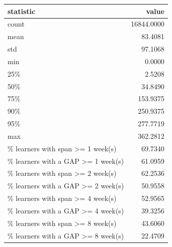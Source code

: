 \begin{tabular}{lr}
\toprule
statistic & value \\
\midrule
count & 16844.0000 \\
mean & 83.4081 \\
std & 97.1068 \\
min & 0.0000 \\
25\% & 2.5208 \\
50\% & 34.8490 \\
75\% & 153.9375 \\
90\% & 250.9375 \\
95\% & 277.7719 \\
max & 362.2812 \\
\% learners with span >= 1 week(s) & 69.7340 \\
\% learners with a GAP >= 1 week(s) & 61.0959 \\
\% learners with span >= 2 week(s) & 62.2536 \\
\% learners with a GAP >= 2 week(s) & 50.9558 \\
\% learners with span >= 4 week(s) & 52.9565 \\
\% learners with a GAP >= 4 week(s) & 39.3256 \\
\% learners with span >= 8 week(s) & 43.6060 \\
\% learners with a GAP >= 8 week(s) & 22.4709 \\
\bottomrule
\end{tabular}
